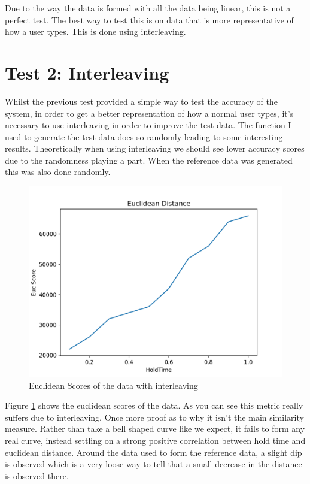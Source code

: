 \documentclass[10pt,a4paper]{report}
\begin{document}
Due to the way the data is formed with all the data being linear, this is not a perfect test. The best way to test this is on data that is more representative of how a user types. This is done using interleaving.


\section{Test 2: Interleaving}

Whilst the previous test provided a simple way to test the accuracy of the system, in order to get a better representation of how a normal user types, it's necessary to use interleaving in order to improve the test data. The function I used to generate the test data does so randomly leading to some interesting results. Theoretically when using interleaving we should see lower accuracy scores due to the randomness playing a part. When the reference data was generated this was also done randomly. 

\begin{figure}
	\centering
	\includegraphics[scale=0.6]{EUCGraph2}
	\caption{Euclidean Scores of the data with interleaving}
	\label{fig:EUCInter}
\end{figure}

Figure \ref{fig:EUCInter} shows the euclidean scores of the data. As you can see this metric really suffers due to interleaving. Once more proof as to why it isn't the main similarity measure. Rather than take a bell shaped curve like we expect, it fails to form any real curve, instead settling on a strong positive correlation between hold time and euclidean distance. Around the data used to form the reference data, a slight dip is observed which is a very loose way to tell that a small decrease in the distance is observed there.
\end{document}
